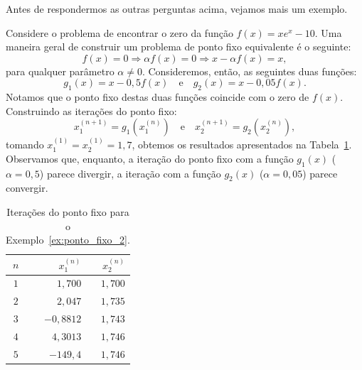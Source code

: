
Antes de respondermos as outras perguntas acima, vejamos mais um exemplo.

\begin{ex}\label{ex:ponto_fixo_2}
  Considere o problema de encontrar o zero da função $f(x) = xe^x - 10$. Uma maneira geral de construir um problema de ponto fixo equivalente é o seguinte:
  \begin{equation*}
    f(x) = 0 \Rightarrow \alpha f(x) = 0 \Rightarrow x - \alpha f(x) = x,
  \end{equation*}
para qualquer parâmetro $\alpha\neq 0$. Consideremos, então, as seguintes duas funções:
\begin{equation*}
  g_1(x) = x - 0,5f(x)\quad\text{e}\quad g_2(x) = x - 0,05f(x).
\end{equation*}
Notamos que o ponto fixo destas duas funções coincide com o zero de $f(x)$. Construindo as iterações do ponto fixo:
\begin{equation*}
  x_1^{(n+1)} = g_1(x_1^{(n)})\quad\text{e}\quad x_2^{(n+1)} = g_2(x_2^{(n)}),
\end{equation*}
tomando $x_1^{(1)} = x_2^{(1)} = 1,7$, obtemos os resultados apresentados na Tabela~\ref{tab:ponto_fixo_2}. Observamos que, enquanto, a iteração do ponto fixo com a função $g_1(x)$ ($\alpha = 0,5$) parece divergir, a iteração com a função $g_2(x)$ ($\alpha = 0,05$) parece convergir.

\begin{table}
  \centering
  \caption{Iterações do ponto fixo para o Exemplo~\ref{ex:ponto_fixo_2}.}\label{tab:ponto_fixo_2}
  \begin{tabular}{c|rr}\hline
    $n$ & $x_1^{(n)}$ & $x_2^{(n)}$ \\\hline
    $1$ & $1,700$ & $1,700$\\
    $2$ & $2,047$ & $1,735$\\
    $3$ & $-0,8812$ & $1,743$ \\
    $4$ & $4,3013$ & $1,746$\\
    $5$ & $-149,4$ & $1,746$\\\hline
  \end{tabular}
\end{table}


\end{ex}
